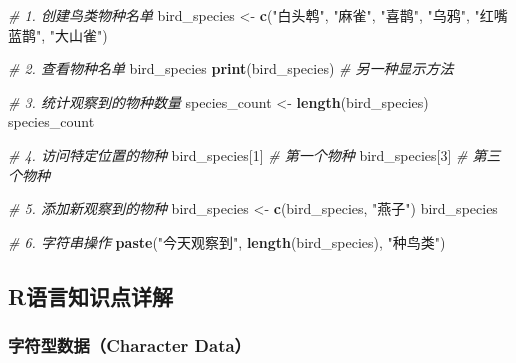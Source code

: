 \documentclass[
]{book}
\newenvironment{Shaded}{\begin{snugshade}}{\end{snugshade}}
\newcommand{\CommentTok}[1]{\textcolor[rgb]{0.56,0.35,0.01}{\textit{#1}}}
\newcommand{\DecValTok}[1]{\textcolor[rgb]{0.00,0.00,0.81}{#1}}
\newcommand{\FunctionTok}[1]{\textcolor[rgb]{0.13,0.29,0.53}{\textbf{#1}}}
\newcommand{\NormalTok}[1]{#1}
\newcommand{\OtherTok}[1]{\textcolor[rgb]{0.56,0.35,0.01}{#1}}
\newcommand{\StringTok}[1]{\textcolor[rgb]{0.31,0.60,0.02}{#1}}
\begin{document}
\begin{Shaded}
\begin{Highlighting}[]
\CommentTok{\# 1. 创建鸟类物种名单}
\NormalTok{bird\_species }\OtherTok{\textless{}{-}} \FunctionTok{c}\NormalTok{(}\StringTok{"白头鹎"}\NormalTok{, }\StringTok{"麻雀"}\NormalTok{, }\StringTok{"喜鹊"}\NormalTok{, }\StringTok{"乌鸦"}\NormalTok{, }\StringTok{"红嘴蓝鹊"}\NormalTok{, }\StringTok{"大山雀"}\NormalTok{)}

\CommentTok{\# 2. 查看物种名单}
\NormalTok{bird\_species}
\FunctionTok{print}\NormalTok{(bird\_species)  }\CommentTok{\# 另一种显示方法}

\CommentTok{\# 3. 统计观察到的物种数量}
\NormalTok{species\_count }\OtherTok{\textless{}{-}} \FunctionTok{length}\NormalTok{(bird\_species)}
\NormalTok{species\_count}

\CommentTok{\# 4. 访问特定位置的物种}
\NormalTok{bird\_species[}\DecValTok{1}\NormalTok{]  }\CommentTok{\# 第一个物种}
\NormalTok{bird\_species[}\DecValTok{3}\NormalTok{]  }\CommentTok{\# 第三个物种}

\CommentTok{\# 5. 添加新观察到的物种}
\NormalTok{bird\_species }\OtherTok{\textless{}{-}} \FunctionTok{c}\NormalTok{(bird\_species, }\StringTok{"燕子"}\NormalTok{)}
\NormalTok{bird\_species}

\CommentTok{\# 6. 字符串操作}
\FunctionTok{paste}\NormalTok{(}\StringTok{"今天观察到"}\NormalTok{, }\FunctionTok{length}\NormalTok{(bird\_species), }\StringTok{"种鸟类"}\NormalTok{)}
\end{Highlighting}
\end{Shaded}

\hypertarget{rux8bedux8a00ux77e5ux8bc6ux70b9ux8be6ux89e3-1}{%
\subsection{R语言知识点详解}\label{rux8bedux8a00ux77e5ux8bc6ux70b9ux8be6ux89e3-1}}

\hypertarget{ux5b57ux7b26ux578bux6570ux636echaracter-data}{%
\subsubsection{字符型数据（Character Data）}\label{ux5b57ux7b26ux578bux6570ux636echaracter-data}}
\end{document}

